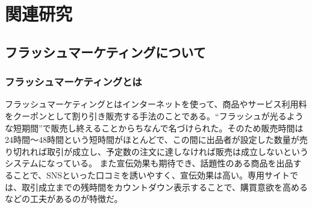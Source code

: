 \chapter{関連研究}
\makeendnotes  %

\section{フラッシュマーケティングについて}
\subsection{フラッシュマーケティングとは}
フラッシュマーケティングとはインターネットを使って、商品やサービス利用料をクーポンとして割り引き販売する手法のことである。“フラッシュが光るような短期間”で販売し終えることからちなんで名づけられた。そのため販売時間は24時間～48時間という短時間がほとんどで、この間に出品者が設定した数量が売り切れれば取引が成立し、予定数の注文に達しなければ販売は成立しないというシステムになっている。
また宣伝効果も期待でき、話題性のある商品を出品することで、SNSといった口コミを誘いやすく、宣伝効果は高い。専用サイトでは、取引成立までの残時間をカウントダウン表示することで、購買意欲を高めるなどの工夫があるのが特徴だ。

